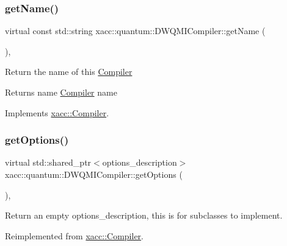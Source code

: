 \subsubsection{\texorpdfstring{get\+Name()}{getName()}}
{\footnotesize\ttfamily virtual const std\+::string xacc\+::quantum\+::\+D\+W\+Q\+M\+I\+Compiler\+::get\+Name (\begin{DoxyParamCaption}{ }\end{DoxyParamCaption})\hspace{0.3cm}{\ttfamily [inline]}, {\ttfamily [virtual]}}

Return the name of this \hyperlink{a01629}{Compiler} \begin{DoxyReturn}{Returns}
name \hyperlink{a01629}{Compiler} name 
\end{DoxyReturn}


Implements \hyperlink{a01629_a87fca9100e6462122f5b687c3a0fb3fb}{xacc\+::\+Compiler}.

\mbox{\label{a01137_a0851334cc33b5b1da2694150a0a1a43c}} 
\subsubsection{\texorpdfstring{get\+Options()}{getOptions()}}
{\footnotesize\ttfamily virtual std\+::shared\+\_\+ptr$<$options\+\_\+description$>$ xacc\+::quantum\+::\+D\+W\+Q\+M\+I\+Compiler\+::get\+Options (\begin{DoxyParamCaption}{ }\end{DoxyParamCaption})\hspace{0.3cm}{\ttfamily [inline]}, {\ttfamily [virtual]}}

Return an empty options\+\_\+description, this is for subclasses to implement. 

Reimplemented from \hyperlink{a01629_a9f5a8965c9c2dd895016d18264ebbe92}{xacc\+::\+Compiler}.

\mbox{\label{a01137_a421daa5286f31e2b5ab4c141a34c94cd}} 
